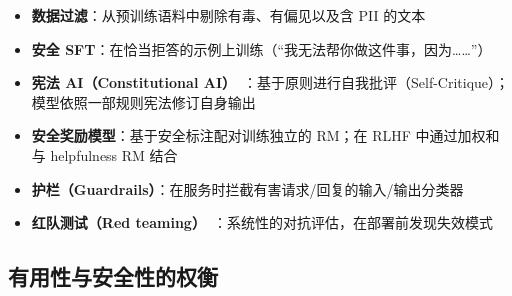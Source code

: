 \begin{keybox}[安全技术]
\begin{itemize}
  \item \textbf{数据过滤}：从预训练语料中剔除有毒、有偏见以及含 PII 的文本
  \item \textbf{安全 SFT}：在恰当拒答的示例上训练（``我无法帮你做这件事，因为……''）
  \item \textbf{宪法 AI（Constitutional AI）}~\cite{bai2022constitutional}：基于原则进行自我批评（Self-Critique）；模型依照一部规则宪法修订自身输出
  \item \textbf{安全奖励模型}：基于安全标注配对训练独立的 RM；在 RLHF 中通过加权和与 helpfulness RM 结合
  \item \textbf{护栏（Guardrails）}：在服务时拦截有害请求/回复的输入/输出分类器
  \item \textbf{红队测试（Red teaming）}~\cite{perez2022red}：系统性的对抗评估，在部署前发现失效模式
\end{itemize}
\end{keybox}

\subsection{有用性与安全性的权衡}
\label{the-helpfulnesssafety-tradeoff}

